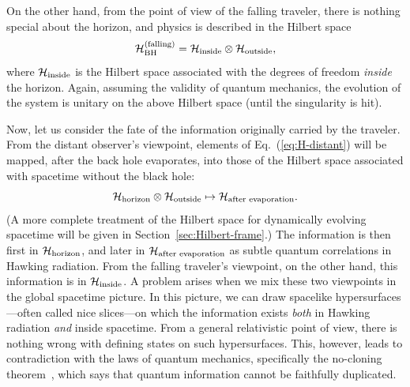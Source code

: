 \documentclass[12pt]{article}
\begin{document}
On the other hand, from the point of view of the falling traveler, there 
is nothing special about the horizon, and physics is described in the 
Hilbert space
%
\begin{equation}
  {\cal H}_{\rm BH}^{\rm (falling)} = 
  {\cal H}_{\rm inside} \otimes {\cal H}_{\rm outside},
\label{eq:H-falling}
\end{equation}
%
where ${\cal H}_{\rm inside}$ is the Hilbert space associated with the 
degrees of freedom {\it inside} the horizon.  Again, assuming the validity 
of quantum mechanics, the evolution of the system is unitary on the 
above Hilbert space (until the singularity is hit).

Now, let us consider the fate of the information originally carried 
by the traveler.  From the distant observer's viewpoint, elements of 
Eq.~(\ref{eq:H-distant}) will be mapped, after the back hole evaporates, 
into those of the Hilbert space associated with spacetime without the 
black hole:
%
\begin{equation}
  {\cal H}_{\rm horizon} \otimes {\cal H}_{\rm outside} 
    \mapsto {\cal H}_{\rm after\,\,evaporation}.
\label{eq:H-distant-map}
\end{equation}
%
(A more complete treatment of the Hilbert space for dynamically evolving 
spacetime will be given in Section~\ref{sec:Hilbert-frame}.)  The 
information is then first in ${\cal H}_{\rm horizon}$, and later in 
${\cal H}_{\rm after\,\,evaporation}$ as subtle quantum correlations 
in Hawking radiation.  From the falling traveler's viewpoint, on the 
other hand, this information is in ${\cal H}_{\rm inside}$.  A problem 
arises when we mix these two viewpoints in the global spacetime picture. 
In this picture, we can draw spacelike hypersurfaces---often called 
nice slices---on which the information exists {\it both} in Hawking 
radiation {\it and} inside spacetime.  From a general relativistic point 
of view, there is nothing wrong with defining states on such hypersurfaces. 
This, however, leads to contradiction with the laws of quantum mechanics, 
specifically the no-cloning theorem~\cite{Wootters:1982zz}, which says 
that quantum information cannot be faithfully duplicated.
\end{document}
